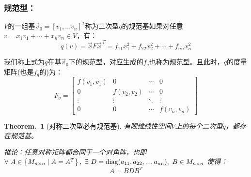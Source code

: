\documentclass[zihao=-4,UTF8]{report}
\theoremstyle{mystyle} %
\newtheorem{theorem}{Theorem.\,}
\begin{document}
\subsubsection{规范型：}
$V$的一组基$\vec{v}_0 = \left[v_1,...v_n\right]^T$称为二次型$q$的规范基如果对任意$v = x_1v_1 +\cdots +x_nv_n \in V$，有：
\begin{equation*}
    q(v) = \vec{x}F\vec{x}^{\,T} = f_{11}x_1^2 + f_{22}x_2^2 + \cdots +f_{nn}x_n^2
\end{equation*}\par
我们称上式为$q$在基$\vec{v}_0$下的规范型，对应生成的$f_q$也称为规范型。且此时，$q$的度量矩阵(也是$f_q$的)为：
\begin{equation*}
    F_q = 
    \begin{bmatrix}  
        f(v_1,v_1) & 0 & \cdots & 0 \\  
        0 & f(v_2,v_2)& \cdots & 0 \\  
        \vdots & \vdots & \ddots & \vdots \\  
        0 & 0 & \cdots & f(v_n,v_n)  
    \end{bmatrix} 
\end{equation*}

\begin{theorem}[对称二次型必有规范基]
   有限维线性空间$V$上的每个二次型$q$，都存在规范基。\par
   推论：任意对称矩阵都合同于一个对角阵，也即$ \forall\ A \in \left\{ M_{n\times n}\mid A = A^T \right\},\ \exists\  D =\\ \text{diag}(a_{11},a_{22},...,a_{nn}),\ B\in M_{n\times n}\ $使得：
   \begin{equation*}
    A = BDB^T
   \end{equation*}
\end{theorem}
\end{document}
